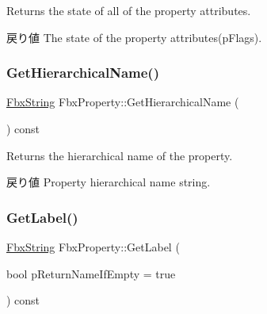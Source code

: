 Returns the state of all of the property attributes. \begin{DoxyReturn}{戻り値}
The state of the property attributes(p\+Flags). 
\end{DoxyReturn}
\mbox{\label{class_fbx_property_a6045fdbb1bbe5a84f44c7f447d2fa52c}} 
\subsubsection{\texorpdfstring{Get\+Hierarchical\+Name()}{GetHierarchicalName()}}
{\footnotesize\ttfamily \hyperlink{class_fbx_string}{Fbx\+String} Fbx\+Property\+::\+Get\+Hierarchical\+Name (\begin{DoxyParamCaption}{ }\end{DoxyParamCaption}) const}

Returns the hierarchical name of the property. \begin{DoxyReturn}{戻り値}
Property hierarchical name string. 
\end{DoxyReturn}
\mbox{\label{class_fbx_property_a6efe7b201b09f1694daa39d32ea2d7e1}} 
\subsubsection{\texorpdfstring{Get\+Label()}{GetLabel()}}
{\footnotesize\ttfamily \hyperlink{class_fbx_string}{Fbx\+String} Fbx\+Property\+::\+Get\+Label (\begin{DoxyParamCaption}\item[{bool}]{p\+Return\+Name\+If\+Empty = {\ttfamily true} }\end{DoxyParamCaption}) const}

